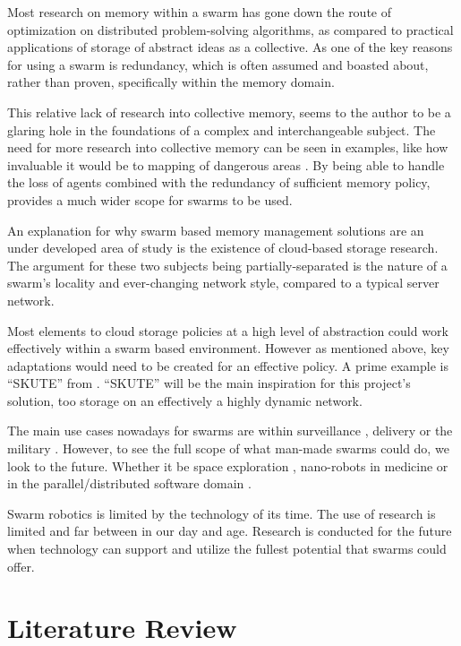 \documentclass{UoYCSproject}
\begin{document}
Most research on memory within a swarm has gone down the route of optimization on distributed problem-solving algorithms, as compared to practical applications of storage of abstract ideas as a collective.
As one of the key reasons for using a swarm is redundancy, which is often assumed and boasted about, rather than proven, specifically within the memory domain.

This relative lack of research into collective memory, seems to the author to be a glaring hole in the foundations of a complex and interchangeable subject.
The need for more research into collective memory can be seen in examples, like how invaluable it would be to mapping of dangerous areas \cite{Cognitive maps mine detection}.
By being able to handle the loss of agents combined with the redundancy of sufficient memory policy, provides a much wider scope for swarms to be used.

An explanation for why swarm based memory management solutions are an under developed area of study is the existence of cloud-based storage research.
The argument for these two subjects being partially-separated is the nature of a swarm's locality and ever-changing network style, compared to a typical server network.


Most elements to cloud storage policies at a high level of abstraction could work effectively within a swarm based environment.
However as mentioned above, key adaptations would need to be created for an effective policy.
A prime example is “SKUTE” from \cite{Distributed Storage}.
“SKUTE” will be the main inspiration for this project's solution, too storage on an effectively a highly dynamic network.

The main use cases nowadays for swarms are within surveillance \cite{UAV, HiveMind}, delivery or the military \cite{Swarm robotics reviewed}.
However, to see the full scope of what man-made swarms could do, we look to the future.
Whether it be space exploration \cite{Space exploration}, nano-robots in medicine or in the parallel/distributed software domain \cite{blockchainandSwarm}.

Swarm robotics is limited by the technology of its time.
The use of research is limited and far between in our day and age.
Research is conducted for the future when technology can support and utilize the fullest potential that swarms could offer.





\chapter{Literature Review}
\label{cha:Litreture Review}
\end{document}
